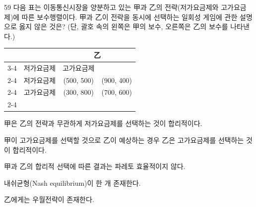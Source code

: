 \begin{question}{59}
다음 표는 이동통신시장을 양분하고 있는 甲과 乙의 전략(저가요금제와 고가요금제)에 따른 보수행렬이다. 甲과 乙이 전략을 동시에 선택하는 일회성 게임에 관한 설명으로 옳지 않은 것은? (단, 괄호 속의 왼쪽은 甲의 보수, 오른쪽은 乙의 보수를 나타낸다.)
\par{\small\centering\begin{tabular}{c|c|c|c|}
\multicolumn{2}{c}{} & \multicolumn{2}{c}{乙} \\ \cline{3-4}
\multicolumn{2}{c|}{} & 저가요금제 & 고가요금제 \\ \cline{2-4}
\multirow{2}{*}{甲} & 저가요금제 & (500, 500) & (900, 400) \\ \cline{2-4}
 & 고가요금제 & (300, 800) & (700, 600) \\ \cline{2-4}
\end{tabular}\par}
\begin{choices}
  \item 甲은 乙의 전략과 무관하게 저가요금제를 선택하는 것이 합리적이다.
  \item 甲이 고가요금제를 선택할 것으로 乙이 예상하는 경우 乙은 고가요금제를 선택하는 것이 합리적이다.
  \item 甲과 乙의 합리적 선택에 따른 결과는 파레토 효율적이지 않다.
  \item 내쉬균형(Nash equilibrium)이 한 개 존재한다.
  \item 乙에게는 우월전략이 존재한다.
\end{choices}
\end{question}
